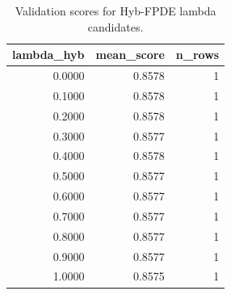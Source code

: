 \begin{table}[t]
\caption{Validation scores for Hyb-FPDE lambda candidates.}
\label{tab:lambda_distribution_computed}
\centering
\begin{tabular}{rrr}
\toprule
lambda\_hyb & mean\_score & n\_rows \\
\midrule
0.0000 & 0.8578 & 1 \\
0.1000 & 0.8578 & 1 \\
0.2000 & 0.8578 & 1 \\
0.3000 & 0.8577 & 1 \\
0.4000 & 0.8578 & 1 \\
0.5000 & 0.8577 & 1 \\
0.6000 & 0.8577 & 1 \\
0.7000 & 0.8577 & 1 \\
0.8000 & 0.8577 & 1 \\
0.9000 & 0.8577 & 1 \\
1.0000 & 0.8575 & 1 \\
\bottomrule
\end{tabular}

\end{table}
